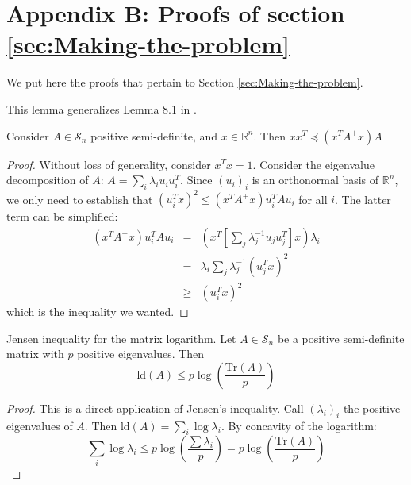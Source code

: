 
\section*{Appendix B: Proofs of section \ref{sec:Making-the-problem}}

We put here the proofs that pertain to Section \ref{sec:Making-the-problem}. 

This lemma generalizes Lemma 8.1 in \cite{Spielman2009a}.

\begin{lemma}\label{lem:simple-inequality}Consider $A\in\mathcal{S}_{n}$
positive semi-definite, and $x\in\mathbb{R}^{n}$. Then $xx^{T}\preceq\left(x^{T}A^{+}x\right)A$

\end{lemma}

\begin{proof}Without loss of generality, consider $x^{T}x=1$. Consider
the eigenvalue decomposition of $A$: $A=\sum_{i}\lambda_{i}u_{i}u_{i}^{T}$.
Since $\left(u_{i}\right)_{i}$ is an orthonormal basis of $\mathbb{R}^{n}$,
we only need to establish that $\left(u_{i}^{T}x\right)^{2}\leq\left(x^{T}A^{+}x\right)u_{i}^{T}Au_{i}$
for all $i$. The latter term can be simplified:
\begin{eqnarray*}
\left(x^{T}A^{+}x\right)u_{i}^{T}Au_{i} & = & \left(x^{T}\left[\sum_{j}\lambda_{j}^{-1}u_{j}u_{j}^{T}\right]x\right)\lambda_{i}\\
 & = & \lambda_{i}\sum_{j}\lambda_{j}^{-1}\left(u_{j}^{T}x\right)^{2}\\
 & \geq & \left(u_{i}^{T}x\right)^{2}
\end{eqnarray*}
which is the inequality we wanted.

\end{proof}

\begin{lemma} \label{lem:Jensen-inequality-matrix-logarithm-1}Jensen
inequality for the matrix logarithm. Let $A\in\mathcal{S}_{n}$ be
a positive semi-definite matrix with $p$ positive eigenvalues. Then
\[
\text{ld}\left(A\right)\leq p\log\left(\frac{\text{Tr}\left(A\right)}{p}\right)
\]
\end{lemma}

\begin{proof}This is a direct application of Jensen's inequality.
Call $\left(\lambda_{i}\right)_{i}$ the positive eigenvalues of $A$.
Then $\text{ld}\left(A\right)=\sum_{i}\log\lambda_{i}$. By concavity
of the logarithm:
\[
\sum_{i}\log\lambda_{i}\leq p\log\left(\frac{\sum\lambda_{i}}{p}\right)=p\log\left(\frac{\text{Tr}\left(A\right)}{p}\right)
\]


\end{proof}
